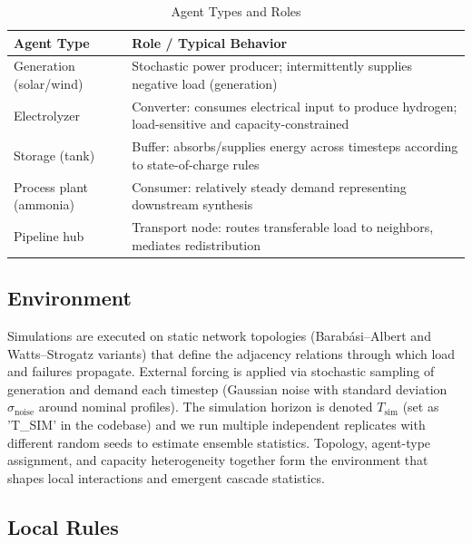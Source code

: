 \documentclass[12pt,a4paper,twoside]{report}
\begin{document}
\begin{table}[htbp]
\centering
\caption{Agent Types and Roles}
\begin{tabularx}{0.8\textwidth}{p{3.5cm} X}
\toprule
\textbf{Agent Type} & \textbf{Role / Typical Behavior} \\
\midrule
Generation (solar/wind) & Stochastic power producer; intermittently supplies negative load (generation)\\
Electrolyzer & Converter: consumes electrical input to produce hydrogen; load-sensitive and capacity-constrained\\
Storage (tank) & Buffer: absorbs/supplies energy across timesteps according to state-of-charge rules\\
Process plant (ammonia) & Consumer: relatively steady demand representing downstream synthesis\\
Pipeline hub & Transport node: routes transferable load to neighbors, mediates redistribution\\
\bottomrule
\end{tabularx}
\end{table}

\subsection{Environment}

Simulations are executed on static network topologies (Barab\'asi--Albert and Watts--Strogatz variants) that define the adjacency relations through which load and failures propagate. External forcing is applied via stochastic sampling of generation and demand each timestep (Gaussian noise with standard deviation $\sigma_{\text{noise}}$ around nominal profiles). The simulation horizon is denoted $T_{\text{sim}}$ (set as 'T\_SIM' in the codebase) and we run multiple independent replicates with different random seeds to estimate ensemble statistics. Topology, agent-type assignment, and capacity heterogeneity together form the environment that shapes local interactions and emergent cascade statistics.

\subsection{Local Rules}
\end{document}
